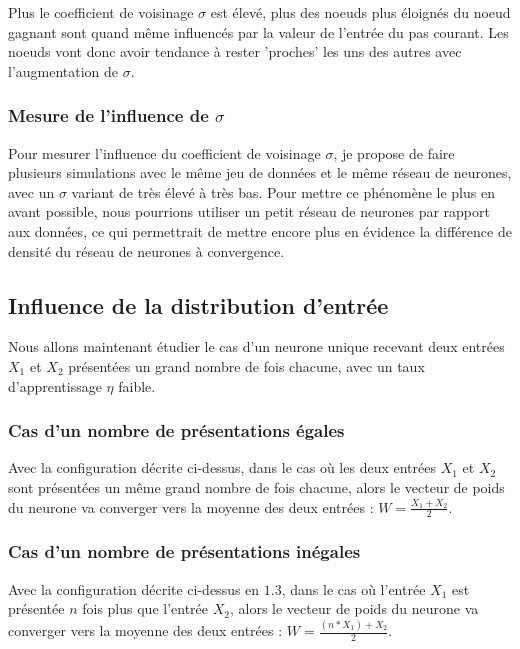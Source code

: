\documentclass{article}
\begin{document}
Plus le coefficient de voisinage $\sigma$ est élevé, plus des noeuds plus éloignés du noeud gagnant sont quand même influencés par la valeur de l'entrée du pas courant. Les noeuds vont donc avoir tendance à rester 'proches' les uns des autres avec l'augmentation de $\sigma$.


\subsubsection{Mesure de l'influence de $\sigma$}

Pour mesurer l'influence du coefficient de voisinage $\sigma$, je propose de faire plusieurs simulations avec le même jeu de données et le même réseau de neurones, avec un $\sigma$ variant de très élevé à très bas. Pour mettre ce phénomène le plus en avant possible, nous pourrions utiliser un petit réseau de neurones par rapport aux données, ce qui permettrait de mettre encore plus en évidence la différence de densité du réseau de neurones à convergence.


\subsection{Influence de la distribution d'entrée}

Nous allons maintenant étudier le cas d'un neurone unique recevant deux entrées $X_1$ et $X_2$ présentées un grand nombre de fois chacune, avec un taux d'apprentissage $\eta$ faible.

\subsubsection{Cas d'un nombre de présentations égales}

Avec la configuration décrite ci-dessus, dans le cas où les deux entrées $X_1$ et $X_2$ sont présentées un même grand nombre de fois chacune, alors le vecteur de poids du neurone va converger vers la moyenne des deux entrées : $W = \frac{X_1 + X_2}{2}$.

\subsubsection{Cas d'un nombre de présentations inégales}

Avec la configuration décrite ci-dessus en $1.3$, dans le cas où l'entrée $X_1$ est présentée $n$ fois plus que l'entrée $X_2$, alors le vecteur de poids du neurone va converger vers la moyenne des deux entrées : $W = \frac{(n*X_1) + X_2}{2}$.
\end{document}
